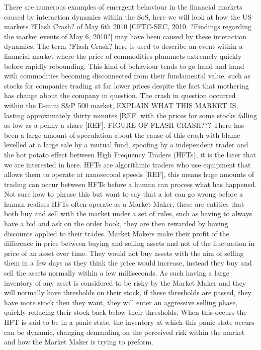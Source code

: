 \documentclass{article}
\begin{document}
There are numerous examples of emergent behaviour in the financial markets caused by interaction dynamics within the SoS, here we will look at how the US markets ?Flash Crash? of May 6th 2010 [CFTC-SEC, 2010. ?Findings regarding the market events of May 6, 2010?] may have been caused by these interaction dynamics. 
The term ?Flash Crash? here is used to describe an event within a financial market where the price of commodities plummets extremely quickly before rapidly rebounding. This kind of behaviour tends to go hand and hand with commodities becoming disconnected from their fundamental value, such as stocks for companies trading at far lower prices despite the fact that mothering has change about the company in question.
The crash in question occurred within the E-mini S&P 500 market, EXPLAIN WHAT THIS MARKET IS, lasting approximately thirty minutes [REF] with the prices for some stocks falling as low as a penny a share [REF].
FIGURE OF FLASH CRASH??? 
There has been a large amount of speculation about the cause of this crash with blame levelled at a large sale by a mutual fund, spoofing by a independent trader and the hot potato effect between High Frequency Traders (HFTs), it is the later that we are interested in here.
HFTs are algorithmic traders who use equipment that allows them to operate at nanosecond speeds [REF], this means huge amounts of trading can occur between HFTs before a human can process what has happened.  Not sure how to phrase this but want to say that a lot can go wrong before a human realises 
HFTs often operate as a Market Maker, these are entities that both buy and sell with the market under a set of rules, such as having to always have a bid and ask on the order book, they are then rewarded by having discounts applied to their trades. Market Makers make their profit of the difference in price between buying and selling assets and not of the fluctuation in price of an asset over time. They would not buy assets with the aim of selling them in a few days as they think the price would increase, instead they buy and sell the assets normally within a few milliseconds. As such having a large inventory of any asset is considered to be risky by the Market Maker and they will normally have thresholds on their stock, if these thresholds are passed, they have more stock then they want, they will enter an aggressive selling phase, quickly reducing their stock back below their thresholds. When this occurs the HFT is said to be in a panic state, the inventory at which this panic state occurs can be dynamic, changing demanding on the perceived risk within the market and how the Market Maker is trying to preform. 
\end{document}
